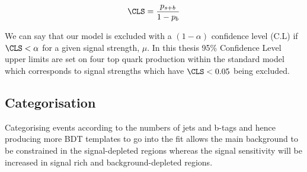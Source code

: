 \begin{equation}
\CLS = \frac{p_{s+b}}{1-p_{b}} 
\label{eqn:CLS}
\end{equation}


We can say that our model is excluded with a $\left(1-\alpha \right)$ confidence level (C.L) if $\CLS < \alpha$ for a given signal strength, $\mu$. In this thesis 95\% Confidence Level upper limits are set on four top quark production within the standard model which corresponds to signal strengths which have $\CLS < 0.05$ being excluded.




\subsection{Categorisation}
\label{sec:Cats}

Categorising events according to the numbers of jets and b-tags and hence producing more BDT templates to go into the fit allows the main \ttbar background to be constrained in the signal-depleted regions whereas the signal sensitivity will be increased in signal rich and background-depleted regions.


